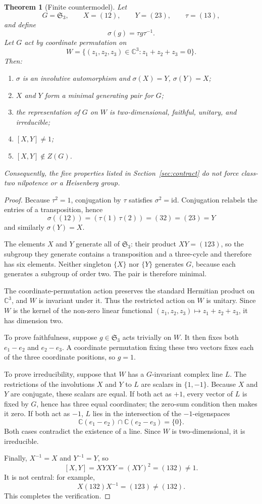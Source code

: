 \documentclass[11pt,a4paper]{article}
\newtheorem{theorem}{Theorem}[section]
\newcommand{\Sym}{\mathfrak{S}}
\begin{document}
\begin{theorem}[Finite countermodel]
\label{thm:countermodel}
Let
\[
G=\Sym_3,\qquad X=(12),\qquad Y=(23),\qquad \tau=(13),
\]
and define
\[
\sigma(g)=\tau g\tau^{-1}.
\]
Let \(G\) act by coordinate permutation on
\[
W=\bigl\{(z_1,z_2,z_3)\in\mathbb{C}^3:
z_1+z_2+z_3=0\bigr\}.
\]
Then:
\begin{enumerate}
  \item \(\sigma\) is an involutive automorphism and \(\sigma(X)=Y\), \(\sigma(Y)=X\);
  \item \(X\) and \(Y\) form a minimal generating pair for \(G\);
  \item the representation of \(G\) on \(W\) is two-dimensional, faithful, unitary, and irreducible;
  \item \([X,Y]\neq 1\);
  \item \([X,Y]\notin Z(G)\).
\end{enumerate}
Consequently, the five properties listed in Section~\ref{sec:contract} do not force class-two nilpotence or
a Heisenberg group.
\end{theorem}

\begin{proof}
Because \(\tau^2=1\), conjugation by \(\tau\) satisfies \(\sigma^2=\mathrm{id}\).
Conjugation relabels the entries of a transposition, hence
\[
\sigma((12))=(\tau(1)\,\tau(2))=(32)=(23)=Y
\]
and similarly \(\sigma(Y)=X\).

The elements \(X\) and \(Y\) generate all of \(\Sym_3\): their product \(XY=(123)\), so the subgroup they
generate contains a transposition and a three-cycle and therefore has six elements.
Neither singleton \(\{X\}\) nor \(\{Y\}\) generates \(G\), because each generates a subgroup of order two.
The pair is therefore minimal.

The coordinate-permutation action preserves the standard Hermitian product on \(\mathbb{C}^3\), and \(W\)
is invariant under it.
Thus the restricted action on \(W\) is unitary.
Since \(W\) is the kernel of the non-zero linear functional
\((z_1,z_2,z_3)\mapsto z_1+z_2+z_3\), it has dimension two.

To prove faithfulness, suppose \(g\in\Sym_3\) acts trivially on \(W\).
It then fixes both \(e_1-e_2\) and \(e_2-e_3\).
A coordinate permutation fixing these two vectors fixes each of the three coordinate positions, so \(g=1\).

To prove irreducibility, suppose that \(W\) has a \(G\)-invariant complex line \(L\).
The restrictions of the involutions \(X\) and \(Y\) to \(L\) are scalars in \(\{1,-1\}\).
Because \(X\) and \(Y\) are conjugate, these scalars are equal.
If both act as \(+1\), every vector of \(L\) is fixed by \(G\), hence has three equal coordinates; the
zero-sum condition then makes it zero.
If both act as \(-1\), \(L\) lies in the intersection of the \(-1\)-eigenspaces
\[
\mathbb{C}(e_1-e_2)\cap\mathbb{C}(e_2-e_3)=\{0\}.
\]
Both cases contradict the existence of a line.
Since \(W\) is two-dimensional, it is irreducible.

Finally, \(X^{-1}=X\) and \(Y^{-1}=Y\), so
\[
[X,Y]=XYXY=(XY)^2=(132)\neq 1.
\]
It is not central: for example,
\[
X(132)X^{-1}=(123)\neq(132).
\]
This completes the verification.
\end{proof}
\end{document}
